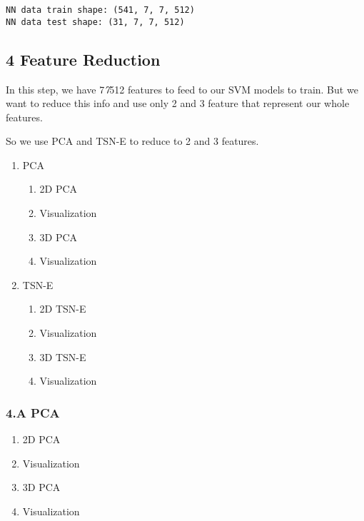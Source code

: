 \documentclass[11pt]{article}
\providecommand{\tightlist}{%
      \setlength{\itemsep}{0pt}\setlength{\parskip}{0pt}}
\begin{document}
    \begin{Verbatim}[commandchars=\\\{\}]
NN data train shape: (541, 7, 7, 512)
NN data test shape: (31, 7, 7, 512)

    \end{Verbatim}

    \hypertarget{feature-reduction}{%
\subsection{4 Feature Reduction}\label{feature-reduction}}

In this step, we have 7\emph{7}512 features to feed to our SVM models to
train. But we want to reduce this info and use only 2 and 3 feature that
represent our whole features.

So we use PCA and TSN-E to reduce to 2 and 3 features.

\begin{enumerate}
\def\labelenumi{\arabic{enumi}.}
\tightlist
\item
  PCA

  \begin{enumerate}
  \def\labelenumii{\arabic{enumii}.}
  \tightlist
  \item
    2D PCA
  \item
    Visualization
  \item
    3D PCA
  \item
    Visualization
  \end{enumerate}
\item
  TSN-E

  \begin{enumerate}
  \def\labelenumii{\arabic{enumii}.}
  \tightlist
  \item
    2D TSN-E
  \item
    Visualization
  \item
    3D TSN-E
  \item
    Visualization
  \end{enumerate}
\end{enumerate}

    \hypertarget{a-pca}{%
\subsubsection{4.A PCA}\label{a-pca}}

\begin{enumerate}
\def\labelenumi{\arabic{enumi}.}
\tightlist
\item
  2D PCA
\item
  Visualization
\item
  3D PCA
\item
  Visualization
\end{enumerate}
\end{document}
